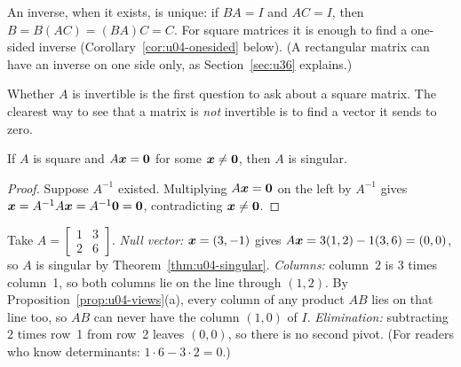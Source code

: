 An inverse, when it exists, is unique: if $BA=I$ and $AC=I$, then
$B=B(AC)=(BA)C=C$. For square matrices it is enough to find a one-sided inverse
(Corollary~\ref{cor:u04-onesided} below). (A rectangular matrix can have an inverse on one side only, as
Section~\ref{sec:u36} explains.)

Whether $A$ is invertible is the first question to ask about a square matrix. The clearest
way to see that a matrix is \emph{not} invertible is to find a vector it sends to zero.

\begin{theorem}[A nonzero solution of $A\vb{x}=\vb{0}$ rules out an inverse]\label{thm:u04-singular}
If $A$ is square and $A\vb{x}=\vb{0}$ for some $\boldsymbol{x}\neq\boldsymbol{0}$, then $A$ is singular.
\end{theorem}

\begin{proof}
Suppose $A^{-1}$ existed. Multiplying $A\vb{x}=\vb{0}$ on the left by $A^{-1}$ gives
$\boldsymbol{x}=A^{-1}A\boldsymbol{x}=A^{-1}\boldsymbol{0}=\boldsymbol{0}$, contradicting $\boldsymbol{x}\neq\boldsymbol{0}$.
\end{proof}

\begin{example}\label{ex:u04-singular}
Take $A=\begin{bmatrix} 1 & 3\\ 2 & 6\end{bmatrix}$.
\emph{Null vector:} $\boldsymbol{x}=(3,-1)$ gives $A\boldsymbol{x}=3(1,2)-1(3,6)=(0,0)$, so $A$ is singular
by Theorem~\ref{thm:u04-singular}.
\emph{Columns:} column~2 is $3$ times column~1, so both columns lie on the line through
$(1,2)$. By Proposition~\ref{prop:u04-views}(a), every column of any product $AB$ lies on that
line too, so $AB$ can never have the column $(1,0)$ of $I$.
\emph{Elimination:} subtracting $2$ times row~1 from row~2 leaves $(0,0)$, so there is no
second pivot. (For readers who know determinants: $1\cdot6-3\cdot2=0$.)
\end{example}

